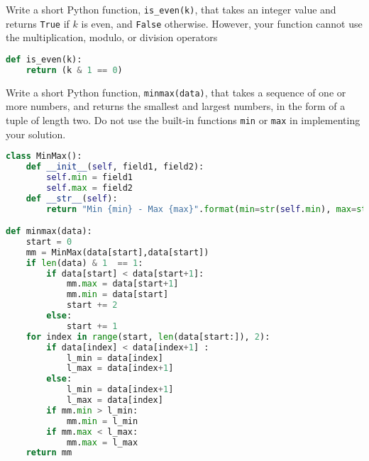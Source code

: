  \label{sssec:ex1_2}

Write a short Python function, \texttt{is_even(k)}, that takes an integer value and returns \texttt{True} if $k$ is even, and \texttt{False} otherwise. However, your function cannot use the multiplication, modulo, or division operators

\begin{lstlisting}[label=ex1.2,caption=Exercise R-1.2,language=Python]
def is_even(k):
    return (k & 1 == 0)
\end{lstlisting}

 \label{sssec:ex1_3}

Write a short Python function, \texttt{minmax(data)}, that takes a sequence of one or more numbers, and returns the smallest and largest numbers, in the form of a tuple of length two. Do not use the built-in functions \texttt{min} or \texttt{max} in implementing your solution.

\begin{lstlisting}[label=ex1.3,caption=Exercise R-1.3, language=Python]
class MinMax():
    def __init__(self, field1, field2):
        self.min = field1
        self.max = field2
    def __str__(self):
        return "Min {min} - Max {max}".format(min=str(self.min), max=str(self.max))

def minmax(data):
    start = 0
    mm = MinMax(data[start],data[start])
    if len(data) & 1  == 1:
        if data[start] < data[start+1]:
            mm.max = data[start+1]
            mm.min = data[start]
            start += 2
        else:
            start += 1
    for index in range(start, len(data[start:]), 2):
        if data[index] < data[index+1] :
            l_min = data[index]
            l_max = data[index+1]
        else:
            l_min = data[index+1]
            l_max = data[index]
        if mm.min > l_min:
            mm.min = l_min
        if mm.max < l_max:
            mm.max = l_max
    return mm
\end{lstlisting}